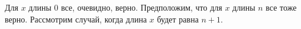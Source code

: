 \documentclass[12pt]{article}
\newcommand{\sgn}{\operatorname{sgn}}
\newcommand{\argmax}{\operatorname{argmax}}
\newcommand{\NA}{\operatorname{NA}}
\begin{document}
Для $ x $ длины 0 все, очевидно, верно. Предположим, что для $ x $ длины $ n $
все тоже верно. Рассмотрим случай, когда длина $ x $ будет равна $ n + 1 $.


% 
% 
% 
% 
% 
\end{document}
